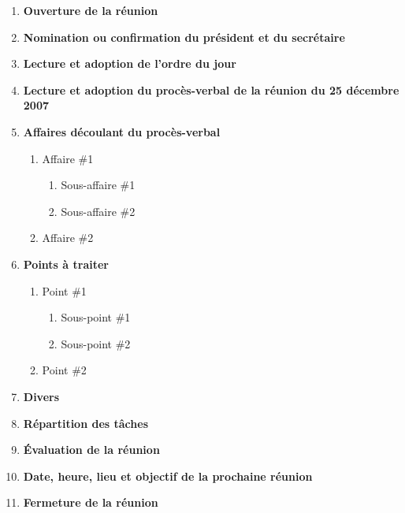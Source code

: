 \documentclass[12pt]{ULojpv}
\begin{document}
\entete
\begin{enumerate}
   \item \textbf{Ouverture de la réunion}
   \item \textbf{Nomination ou confirmation du président et du secrétaire}
   \item \textbf{Lecture et adoption de l'ordre du jour}
   \item \textbf{Lecture et adoption du procès-verbal de la réunion du 25 décembre 2007}
   \item \textbf{Affaires découlant du procès-verbal}
      \begin{enumerate}
         \item Affaire \#1
            \begin{enumerate}
               \item Sous-affaire \#1
               \item Sous-affaire \#2
            \end{enumerate}
         \item Affaire \#2
      \end{enumerate}
   \item \textbf{Points à traiter}
      \begin{enumerate}
         \item Point \#1
            \begin{enumerate}
               \item Sous-point \#1
               \item Sous-point \#2
            \end{enumerate}
         \item Point \#2
      \end{enumerate}
   \item \textbf{Divers}
   \item \textbf{Répartition des tâches}
   \item \textbf{Évaluation de la réunion}
   \item \textbf{Date, heure, lieu et objectif de la prochaine réunion}
   \item \textbf{Fermeture de la réunion}
\end{enumerate}
\end{document}
